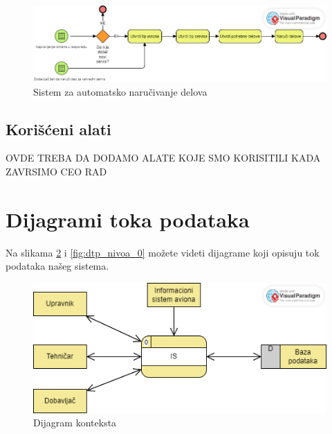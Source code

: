 \documentclass[a4paper]{article}
\begin{document}
\begin{figure}[H]
\begin{center}
\includegraphics[scale=0.55, width = 1.1\textwidth]{Dijagrami/BPMN_Dijagrami/BPMN_automatsko_narucivanje.png}
\end{center}
\caption{Sistem za automatsko naručivanje delova}
\label{fig:bpmn_automatsko_narucivanje}
\end{figure}

\subsection{Korišćeni alati}
\label{subsec:korisceni_alati}

OVDE TREBA DA DODAMO ALATE KOJE SMO KORISITILI KADA ZAVRSIMO CEO RAD

\section{Dijagrami toka podataka}
\label{sec:dijagrami_toka_podataka}
Na slikama \ref{fig:dtp_dijagram_konteksta} i \ref{fig:dtp_nivoa_0} možete videti dijagrame koji opisuju tok podataka našeg sistema. 

\begin{figure}[H]
\begin{center}
\includegraphics[scale=0.55]{Dijagrami/Dijagrami_toka_podataka/DTP_dijagram_konteksta.png}
\end{center}
\caption{Dijagram konteksta}
\label{fig:dtp_dijagram_konteksta}
\end{figure}
\end{document}
